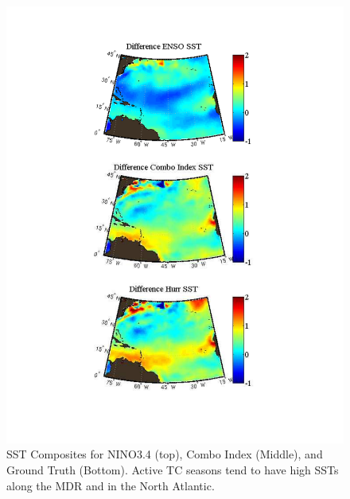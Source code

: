 \documentclass[]{article}
\begin{document}
\begin{figure}[ht]
\begin{minipage}[b]{0.55\linewidth}
\includegraphics[width=\textwidth]{figures/comboIndex/composites/compareMDRCompositesSST.pdf}
\caption{SST Composites for NINO3.4 (top), Combo Index (Middle), and Ground Truth (Bottom). Active TC seasons tend to have high SSTs along the MDR and in the North Atlantic.}
\label{fig:sst_comp}
\end{minipage}
\end{figure}
\end{document}
